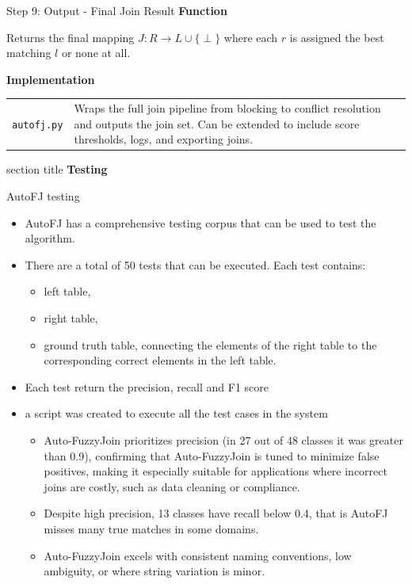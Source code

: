\documentclass[8pt]{beamer} %
\begin{document}
\begin{frame}{Step 9: Output - Final Join Result}
	\textbf{Function}
	
	Returns the final mapping $J: R \rightarrow L \cup \{\perp\}$ where each $r$ is assigned the best matching $l$ or none at all.
	
	\vspace{2em}
	
	\textbf{Implementation}

	\begin{tabular}{l p{3in}}	
		\texttt{autofj.py} & Wraps the full join pipeline from blocking to conflict resolution and outputs the join set. Can be extended to include score thresholds, logs, and exporting joins.
	\end{tabular}


\end{frame}

\begin{frame}[plain]
	\begin{beamercolorbox}[wd=\paperwidth,ht=0.7\paperheight,dp=2ex,center]{section title}
		\Huge \textbf{Testing}
	\end{beamercolorbox}
\end{frame}

\begin{frame}{AutoFJ testing}
	\begin{itemize}
		\item AutoFJ has a comprehensive testing corpus that can be used to test the algorithm.
		\item There are a total of 50 tests that can be executed. Each test contains:
		\begin{itemize}
			\item left table,
			\item right table,
			\item ground truth table, connecting the elements of the right table to the corresponding correct elements in the left table.
		\end{itemize}
		\item Each test return the precision, recall and F1 score
		\item a script was created to execute all the test cases in the system
		\begin{itemize}
			\item Auto-FuzzyJoin prioritizes precision (in 27 out of 48 classes it was greater than 0.9), confirming that Auto-FuzzyJoin is tuned to minimize false positives, making it especially suitable for applications where incorrect joins are costly, such as data cleaning or compliance.
			\item Despite high precision, 13 classes have recall below 0.4, that is AutoFJ misses many true matches in some domains.
			\item Auto-FuzzyJoin excels with consistent naming conventions, low ambiguity, or where string variation is minor.
		\end{itemize}
	\end{itemize}

\end{frame}
\end{document}
